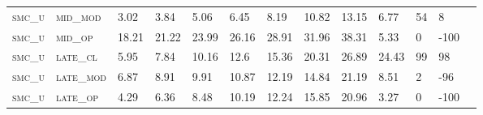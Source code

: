 \begin{landscape}
\begin{table}[!htbp]
\begin{tabular}{@{}lllllllllllll@{}}
\footnotesize \textsc{smc\_u}      & \footnotesize \textsc{mid\_mod  }               & \footnotesize 3.02           & \footnotesize  3.84           & \footnotesize 5.06             & \footnotesize 6.45             & \footnotesize 8.19             & \footnotesize 10.82            & \footnotesize 13.15       & \footnotesize 6.77     & \footnotesize 54      & \footnotesize 8    \\
\footnotesize \textsc{smc\_u}      & \footnotesize \textsc{mid\_op   }               & \footnotesize 18.21          & \footnotesize  21.22          & \footnotesize 23.99            & \footnotesize 26.16            & \footnotesize 28.91            & \footnotesize 31.96            & \footnotesize 38.31       & \footnotesize 5.33     & \footnotesize 0       & \footnotesize -100    \\
\footnotesize \textsc{smc\_u}      & \footnotesize \textsc{late\_cl  }               & \footnotesize 5.95           & \footnotesize  7.84           & \footnotesize 10.16            & \footnotesize 12.6             & \footnotesize 15.36            & \footnotesize 20.31            & \footnotesize 26.89       & \footnotesize 24.43    & \footnotesize 99      & \footnotesize 98    \\
\footnotesize \textsc{smc\_u}      & \footnotesize \textsc{late\_mod }               & \footnotesize 6.87           & \footnotesize  8.91           & \footnotesize 9.91             & \footnotesize 10.87            & \footnotesize 12.19            & \footnotesize 14.84            & \footnotesize 21.19       & \footnotesize 8.51     & \footnotesize 2       & \footnotesize -96    \\
\footnotesize \textsc{smc\_u}      & \footnotesize \textsc{late\_op  }               & \footnotesize 4.29           & \footnotesize  6.36           & \footnotesize 8.48             & \footnotesize 10.19            & \footnotesize 12.24            & \footnotesize 15.85            & \footnotesize 20.96       & \footnotesize 3.27     & \footnotesize 0       & \footnotesize -100    \\
\end{tabular}
\end{table}
\end{landscape}


